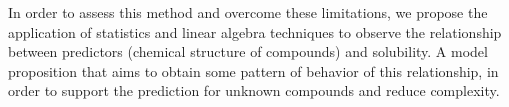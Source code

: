 In order to assess this method and overcome these limitations, we propose the application of statistics and linear algebra techniques to observe the relationship between predictors (chemical structure of compounds) and solubility. A model proposition that aims to obtain some pattern of behavior of this relationship, in order to support the prediction for unknown compounds and reduce complexity. 